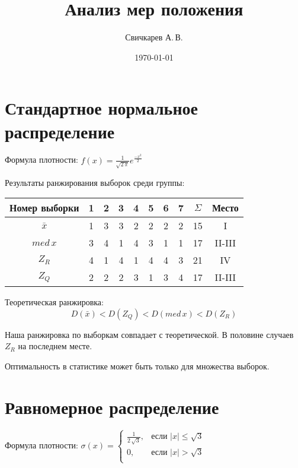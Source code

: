 \documentclass{article} %
\title{Анализ мер положения} %
\author{Свичкарев А.\,В.} %
\date{\today} %
\begin{document}

\maketitle %

\section{Стандартное нормальное распределение}

Формула плотности:
\( f(x) = \frac{1}{\sqrt{ 2\,\pi }}e^{\frac{-x^2}{2}} \)

Результаты ранжирования выборок среди группы:
\begin{center}
	\begin{tabular}{|c| c|c|c|c|c|c|c| c|c|} \hline
		Номер выборки & 1 & 2 & 3 & 4 & 5 & 6 & 7 & \(\Sigma\) & Место \\ \hline
		\(\bar{x}\)   & 1 & 3 & 3 & 2 & 2 & 2 & 2 & 15 & I \\ \hline
		\(med \, x\)  & 3 & 4 & 1 & 4 & 3 & 1 & 1 & 17 & II-III \\ \hline
		\(Z_R\)       & 4 & 1 & 4 & 1 & 4 & 4 & 3 & 21 & IV \\ \hline
		\(Z_Q\)       & 2 & 2 & 2 & 3 & 1 & 3 & 4 & 17 & II-III \\ \hline
	\end{tabular}
\end{center}

Теоретическая ранжировка:
\[ D(\bar{x}) < D(Z_Q) < D(med \, x) < D(Z_R) \]

Наша ранжировка по выборкам совпадает с теоретической. В половине случаев \(Z_R\) на последнем месте.

Оптимальность в статистике может быть только для множества выборок.


\section{Равномерное распределение}
Формула плотности:
\( \sigma(x) = \left\{
	\begin{array}{cl}
		\frac{1}{2 \, \sqrt{3}}, & \mbox{если } \lvert x \rvert \leq \sqrt{3} \\
		0, & \mbox{если } \lvert x \rvert > \sqrt{3}  \\
\end{array} \right. \)
\end{document}
